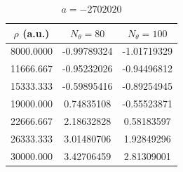 \begin{table}[h!]
	\centering
	\begin{tabular}{||c c c||} 
		\hline
		$\rho$ (a.u.) & $N_{\theta}=80$ & $N_{\theta}=100$  \\ [0.5ex] 
		\hline\hline
		8000.0000   & -0.99789324     & -1.01719329  \\ 
		11666.667	 & -0.95232026   & -0.94496812  \\
		15333.333   & -0.59895416  & -0.89254945  \\
		19000.000   & 0.74835108  & -0.55523871   \\
		22666.667   & 2.18632828  & 0.58183597   \\
		26333.333   & 3.01480706  & 1.92849296  \\  
		30000.000   & 3.42706459 & 2.81309001  \\ [1ex] 
		\hline
	\end{tabular}
	\caption{$a = -2702020$}
	\label{table:Res_1}
\end{table} 